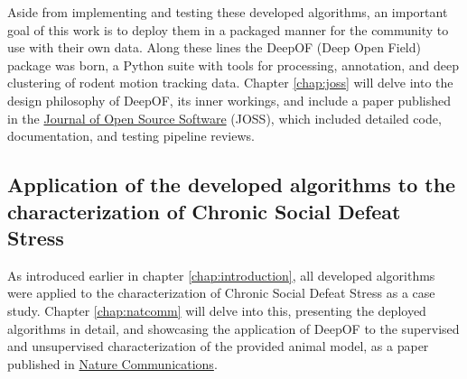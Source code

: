 Aside from implementing and testing these developed algorithms, an important goal of this work is to deploy them in a packaged manner for the community to use with their own data. Along these lines the DeepOF (Deep Open Field) package was born, a Python suite with tools for processing, annotation, and deep clustering of rodent motion tracking data. Chapter \ref{chap:joss} will delve into the design philosophy of DeepOF, its inner workings, and include a paper published in the \href{https://joss.theoj.org/}{Journal of Open Source Software} (JOSS), which included detailed code, documentation, and testing pipeline reviews.

\subsection{Application of the developed algorithms to the characterization of Chronic Social Defeat Stress}

As introduced earlier in chapter \ref{chap:introduction}, all developed algorithms were applied to the characterization of Chronic Social Defeat Stress as a case study. Chapter \ref{chap:natcomm} will delve into this, presenting the deployed algorithms in detail, and showcasing the application of DeepOF to the supervised and unsupervised characterization of the provided animal model, as a paper published in \href{https://www.nature.com/ncomms/}{Nature Communications}.